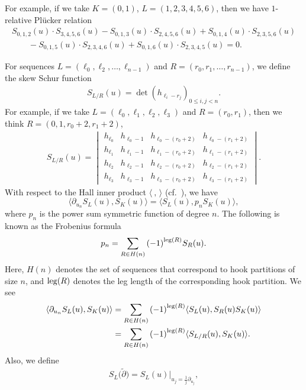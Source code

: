 \documentclass[10pt,a4paper]{amsart}
\numberwithin{equation}{section}
\begin{document}
For example, if we take $K=(0,1)$, $L=(1,2,3,4,5,6)$, then we have $1$-relative Pl\"ucker relation
\begin{gather*}
S_{0,1,2}(u)\cdot S_{3,4,5,6}(u)-S_{0,1,3}(u)\cdot S_{2,4,5,6}(u)+S_{0,1,4}(u)\cdot S_{2,3,5,6}(u)\\
\qquad{}-S_{0,1,5}(u)\cdot S_{2,3,4,6}(u)+S_{0,1,6}(u)\cdot S_{2,3,4,5}(u)=0.
\end{gather*}

For sequences $L=(\ell_0,\ell_2,\dots,\ell_{n-1})$ and $R=(r_0,r_1,\dots,r_{n-1})$, we define the skew Schur function
\begin{gather*}
S_{L/R}(u)=\det{(h_{\ell_i-r_{j}})}_{0\leq i,j< n}.%
\end{gather*}
For example, if we take $L=(\ell_0,\ell_1,\ell_{2},\ell_{3})$ and $R=(r_0,r_1)$, then we think $R=(0,1,r_{0}+2,r_{1}+2)$,
\begin{gather*}
S_{L/R}(u)=
\begin{vmatrix}
h_{\ell_0} & h_{\ell_0-1} & h_{\ell_0-(r_0+2)} & h_{\ell_0-(r_1+2)} \\
h_{\ell_1} & h_{\ell_1-1} & h_{\ell_1-(r_0+2)} & h_{\ell_1-(r_1+2)} \\
h_{\ell_2} & h_{\ell_2-1} & h_{\ell_2-(r_0+2)} &h_{\ell_2-(r_1+2)}\\
h_{\ell_3} & h_{\ell_3-1} & h_{\ell_3-(r_0+2)} & h_{\ell_3-(r_1+2)}
\end{vmatrix}.
\end{gather*}
With respect to the Hall inner product $\langle\ ,\, \rangle$ (cf.\ \cite{mac}), we have
\[
\langle \partial_{u_n} S_{L}(u), S_{K}(u)\rangle =\langle S_{L}(u), p_nS_{K}(u)\rangle,\nonumber
\]
where $p_n$ is the power sum symmetric function of degree $n$.
The following is known as the Frobenius formula \cite{mac}
\begin{gather*}
p_{n}=\sum_{R\in H(n)}{(-1)}^{{\rm leg}(R)}S_{R}(u).\nonumber
\end{gather*}
Here, $H(n)$ denotes the set of sequences that correspond to hook partitions of size $n$, and ${\rm leg}(R)$ denotes the leg length of the corresponding hook partition. We see
\begin{align*}
\langle \partial_{u_n} S_{L}(u), S_{K}(u)\rangle &=\sum_{R\in H(n)}{(-1)}^{{\rm leg}(R)}\langle S_{L}(u),S_{R}(u)S_{K}(u)\rangle\nonumber\\
&=\sum_{R\in H(n)}{(-1)}^{{\rm leg}(R)}\langle S_{L/R}(u),S_{K}(u)\rangle.\nonumber
\end{align*}
Also, we define
\begin{gather*}
S_L\bigl(\tilde{\partial}\bigr)=S_{L}(u)|_{u_j=\frac{1}{j}\partial_{u_j}},
\end{gather*}
\end{document}
